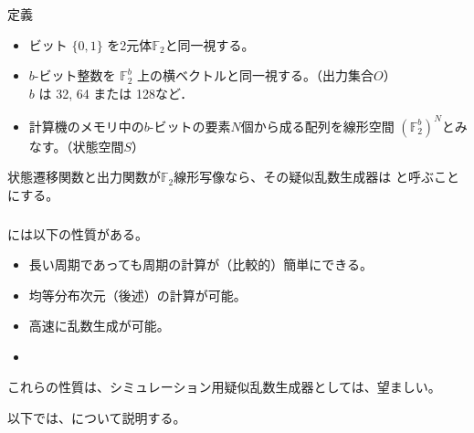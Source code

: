 \documentclass[cjk, dvips, handout, trans, xcolor=dvipsnames]{beamer}
\def\F2{{\mathbb F}_2}
\def\bw{{{\mathbf w}}}
\begin{document}
\begin{frame}[t]
  \frametitle{\insertsubsection}
  \begin{block}{定義}
    \begin{itemize}
    \item ビット $\{0,1\}$ を2元体$\F2$と同一視する。
    \item $b$-ビット整数を $\F2^{b}$ 上の横ベクトルと同一視する。（出力集合$O$）\\
      $b$ は 32, 64 または 128など．
    \item 計算機のメモリ中の$b$-ビットの要素$N$個から成る配列を線形空間
      $(\F2^{b})^N$とみなす。（状態空間$S$）
    \end{itemize}
  \end{block}

  状態遷移関数と出力関数が$\F2$線形写像なら、その疑似乱数生成器は
  \strong{\FLPRNG}と呼ぶことにする。
\end{frame}

\begin{frame}[t]
  \frametitle{\insertsubsection}

  \FLPRNG には以下の性質がある。
  \begin{itemize}
  \item 長い周期であっても周期の計算が（比較的）簡単にできる。
  \item 均等分布次元（後述）の計算が可能。
  \item 高速に乱数生成が可能。
  \item {}
  \end{itemize}

  \pause
  これらの性質は、シミュレーション用疑似乱数生成器としては、望ましい。

  以下では、\FLPRNG について説明する。
\end{frame}

\end{document}
